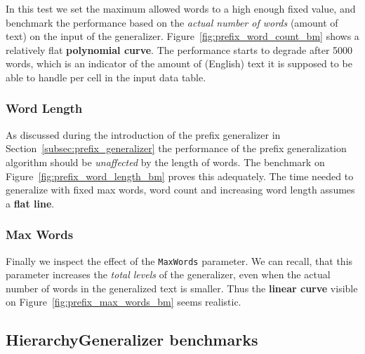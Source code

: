 In this test we set the maximum allowed words to a high enough fixed value, and benchmark the performance based on the \emph{actual number of words} (amount of text) on the input of the generalizer. Figure~\ref{fig:prefix_word_count_bm} shows a relatively flat \textbf{polynomial curve}. The performance starts to degrade after 5000 words, which is an indicator of the amount of (English) text it is supposed to be able to handle per cell in the input data table.

\vspace{\baselineskip}


\subsubsection{Word Length}

As discussed during the introduction of the prefix generalizer in Section~\ref{subsec:prefix_generalizer} the performance of the prefix generalization algorithm should be \emph{unaffected} by the length of words. The benchmark on Figure~\ref{fig:prefix_word_length_bm} proves this adequately. The time needed to generalize with fixed max words, word count and increasing word length assumes a \textbf{flat line}.

\vspace{\baselineskip}


\subsubsection{Max Words}

Finally we inspect the effect of the \texttt{MaxWords} parameter. We can recall, that this parameter increases the \emph{total levels} of the generalizer, even when the actual number of words in the generalized text is smaller. Thus the \textbf{linear curve} visible on Figure~\ref{fig:prefix_max_words_bm} seems realistic.

\vspace{\baselineskip}


\subsection{HierarchyGeneralizer benchmarks}

